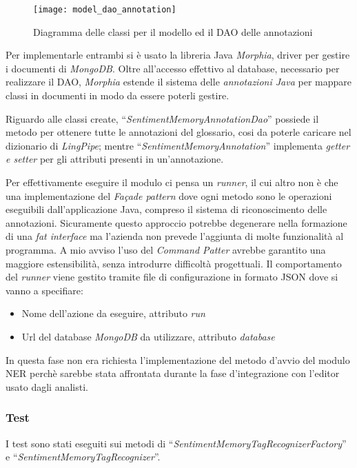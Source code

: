 \begin{figure}[H]
\begin{center}
\texttt{[image: model\_dao\_annotation]}
\caption{
Diagramma delle classi per il modello ed il DAO delle annotazioni
}
\label{fig:model_dao_annotation}
\end{center}
\end{figure}

Per implementarle entrambi si è usato la libreria Java \textit{Morphia}, driver
per gestire i documenti di \textit{MongoDB}. Oltre all'accesso effettivo al
database, necessario per realizzare il \gls{DAO}, \textit{Morphia} estende il
sistema delle \textit{annotazioni Java} per mappare classi in documenti in modo
da essere poterli gestire.

Riguardo alle classi create, ``\textit{SentimentMemoryAnnotationDao}'' possiede
il metodo per ottenere tutte le annotazioni del glossario, cosi da poterle
caricare nel dizionario di \textit{LingPipe}; mentre
``\textit{SentimentMemoryAnnotation}'' implementa \textit{getter e setter} per
gli attributi presenti in un'annotazione.

Per effettivamente eseguire il modulo ci pensa un \textit{runner}, il cui altro
non è che una implementazione del \textit{Façade pattern} dove ogni metodo sono
le operazioni eseguibili dall'applicazione Java, compreso il sistema di
riconoscimento delle annotazioni. Sicuramente questo approccio potrebbe
degenerare nella formazione di una \textit{fat interface} ma l'azienda non
prevede l'aggiunta di molte funzionalità al programma. A mio avviso l'uso del
\textit{Command Patter} avrebbe garantito una maggiore estensibilità, senza
introdurre difficoltà progettuali. Il comportamento del \textit{runner} viene
gestito tramite file di configurazione in formato \gls{JSON} dove si vanno a
specifiare:
\begin{itemize}
\item Nome dell'azione da eseguire, attributo \textit{run}
\item Url del database \textit{MongoDB} da utilizzare, attributo
\textit{database}
\end{itemize}

In questa fase non era richiesta l'implementazione del metodo d'avvio del modulo
\gls{NER} perchè sarebbe stata affrontata durante la fase d'integrazione con
l'editor usato dagli analisti.

\subsubsection{Test}
I test sono stati eseguiti sui metodi di
``\textit{SentimentMemoryTagRecognizerFactory}'' e
``\textit{SentimentMemoryTagRecognizer}''.


